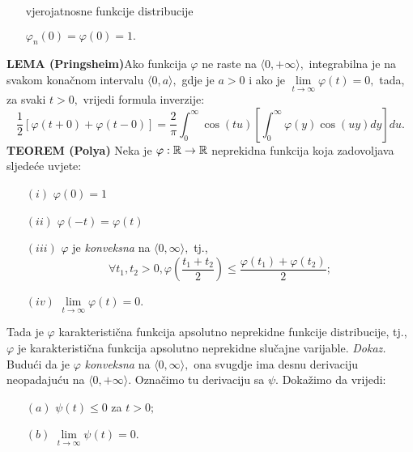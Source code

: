 \documentclass{article}
\begin{document}
\begin{itemize}
    \item[\ding{228}] vjerojatnosne funkcije distribucije
    \item[\ding{228}] \(\varphi_n(0)=\varphi(0)=1.\) 
\end{itemize}
\textbf{LEMA (Pringsheim)}\newline Ako funkcija \(\varphi\) ne raste na \(\langle0,+\infty\rangle,\) integrabilna je na svakom konačnom intervalu \(\langle0,a\rangle,\) gdje je \(a>0\) i ako je \(\lim\limits_{t\to\infty}\varphi(t)=0,\) tada, za svaki \(t>0,\) vrijedi formula inverzije: \[\frac12\left[\varphi(t+0)+\varphi(t-0)\right]=\frac2\pi\int_0^\infty\cos(tu)\left[\int_0^\infty\varphi(y)\cos(uy)dy\right]du.\]
\textbf{TEOREM (Polya)}\newline 
Neka je \(\varphi:\Bbb R\to\Bbb R\) neprekidna funkcija koja zadovoljava sljedeće uvjete:
\begin{enumerate}
    \item[\((i)\)] \(\varphi(0)=1\)
    \item[\((ii)\)] \(\varphi(-t)=\varphi(t)\)
    \item[\((iii)\)] \(\varphi\) je \emph{konveksna} na \(\langle0,\infty\rangle,\) tj., \[\forall t_1,t_2>0,\varphi\left(\frac{t_1+t_2}2\right)\le\frac{\varphi(t_1)+\varphi(t_2)}2;\]
    \item[\((iv)\)] \(\lim\limits_{t\to\infty}\varphi(t)=0.\)
\end{enumerate} Tada je \(\varphi\) karakteristična funkcija apsolutno neprekidne  funkcije distribucije, tj., \(\varphi\) je karakteristična funkcija apsolutno neprekidne slučajne varijable.\newline\newline
\textit{Dokaz.}\newline
Budući da je \(\varphi\) \emph{konveksna} na \(\langle0,\infty\rangle,\) ona svugdje ima desnu derivaciju neopadajuću na \(\langle0,+\infty\rangle.\) Označimo tu derivaciju sa \(\psi.\) Dokažimo da vrijedi:
\begin{enumerate}
    \item[\((a)\)] \(\psi(t)\le 0\) za \(t>0;\)
    \item[\((b)\)] \(\lim\limits_{t\to\infty}\psi(t)=0.\) 
\end{enumerate}
\end{document}
